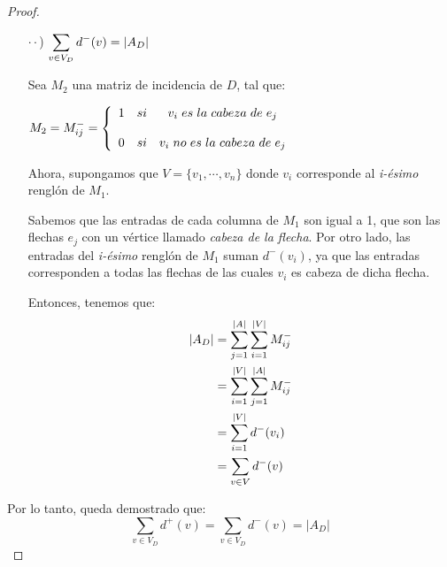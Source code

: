 \documentclass{article}
\begin{document}
\begin{enumerate}
\begin{proof}
\begin{itemize}
        \item[$\cdot\cdot$)] $\displaystyle \sum_{v \in V_{D}} d^{-}(v) = \abs{A_{D}}$

          Sea $M_{2}$ una matriz de incidencia de $D$, tal que:
          \begin{center}
            $M_{2} = M^{-}_{ij}
            = \left \{
            \begin{array}{lcc}
              1 &   si  & v_{i} \hspace{0.3em} es \hspace{0.3em} la \hspace{0.3em}
              cabeza \hspace{0.3em} de \hspace{0.3em} e_{j} \\
              \\0 &  si & v_{i} \hspace{0.3em} no \hspace{0.3em} es \hspace{0.3em}
              la \hspace{0.3em} cabeza \hspace{0.3em} de \hspace{0.3em} e_{j}
            \end{array}
            \right.$
          \end{center}
          Ahora, supongamos que $V = \{v_{1}, \cdots, v_{n}\}$ donde $v_{i}$
          corresponde al \textit{i-ésimo} renglón de $M_{1}$.

          Sabemos que las entradas de cada columna de $M_{1}$ son igual a 1,
          que son las flechas $e_{j}$ con un vértice llamado \textit{cabeza de la flecha}.
          Por otro lado, las entradas del \textit{i-ésimo} renglón de $M_{1}$
          suman $d^{-}(v_{i})$, ya que las entradas corresponden a todas las
          flechas de las cuales $v_{i}$ es cabeza de dicha flecha.

          Entonces, tenemos que:
          \begin{equation*}
            \begin{split}
              \abs{A_{D}} & = \sum_{j=1}^{\abs{A}} \sum_{i=1}^{\abs{V}} M^{-}_{ij} \\
              & = \sum_{i=1}^{\abs{V}} \sum_{j=1}^{\abs{A}} M^{-}_{ij} \\
              & = \sum_{i=1}^{\abs{V}} d^{-}(v_{i}) \\
              & = \sum_{v \in V} d^{-}(v)
            \end{split}
          \end{equation*}
      \end{itemize}
      Por lo tanto, queda demostrado que:
      \[
      \displaystyle \sum_{v \in V_D} d^+(v) = \sum_{v \in V_D} d^-(v) = |A_D|
      \]
    \end{proof}


\end{enumerate}
\end{document}
